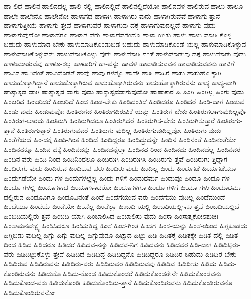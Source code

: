 {ಹಾ-ಲಿದೆ
ಹಾಲಿನ
ಹಾಲಿನದಲ್ಲ
ಹಾಲಿ-ನಲ್ಲಿ
ಹಾಲಿನಲ್ಲಿದೆ
ಹಾಲಿನಲ್ಲಿದೆಯೋ
ಹಾಲಿನವಳ
ಹಾಲಿರುವ
ಹಾಲು
ಹಾಲೂ
ಹಾಲೇ
ಹಾಲೇನೊ
ಹಾಲೇನೋ
ಹಾಳಾಗದ
ಹಾಳಾಗಿ
ಹಾಳಾಗಿರು-ವುದು
ಹಾಳಾಗಿರುವೆವೆ
ಹಾಳಾಗು-ತ್ತಾನೆ
ಹಾಳಾಗುತ್ತೀಯೆ
ಹಾಳಾಗು-ತ್ತೇವೆ
ಹಾಳಾಗುವರೆ
ಹಾಳಾಗುವು-ದಕ್ಕೆ
ಹಾಳಾಗುವುದಲ್ಲದೆ
ಹಾಳಾಗು-ವುದು
ಹಾಳಾಗುವುದೋ
ಹಾಳಾದರೂ
ಹಾಳಾದ-ವರು
ಹಾಳಾದವರೆಂದೂ
ಹಾಳಾ-ಯಿತು
ಹಾಳು
ಹಾಳು-ಮಾಡಿ-ಕೊಳ್ಳ-ಬಹುದು
ಹಾಳುಮಾಡ-ಬೇಕು
ಹಾಳುಮಾಡಿಕೊಂಡುಬಿಡ-ಬಹುದು
ಹಾಳುಮಾಡಿಕೊಂಡೆ-ಯಲ್ಲ
ಹಾಳುಮಾಡಿಕೊಳ್ಳುವ
ಹಾಳುಮಾಡಿಕೊಳ್ಳುವನು
ಹಾಳುಮಾಡಿಕೊಳ್ಳು-ವುದು
ಹಾಳುಮಾಡಿ-ದಂತೆ
ಹಾಳುಮಾಡುವು-ದಕ್ಕೆ
ಹಾಳುಮಾಡು-ವುದು
ಹಾಳುಮಾಡುವೆವು
ಹಾಳೂ-ರಲ್ಲ
ಹಾಳೂರಿಗೆ
ಹಾ-ವನ್ನು
ಹಾವಳಿ
ಹಾವಾಡಿಸುವವನ
ಹಾವಾಡಿಸುವವನು
ಹಾವಿಗೆ
ಹಾವಿನ
ಹಾವಿನಂತೆ
ಹಾವಿನೊಡನೆ
ಹಾವು
ಹಾವು-ಗಳನ್ನೂ
ಹಾವೇ
ಹಾಸಿ
ಹಾಸಿಗೆ
ಹಾಸು
ಹಾಸುಹೊ-ಕ್ಕಾಗಿ
ಹಾಸುಹೊಕ್ಕಾಗಿದ್ದಾನೆ
ಹಾಸುಹೊಕ್ಕಾಗಿರುವ
ಹಾಸುಹೊಕ್ಕಾಗಿರುವನು
ಹಾಸುಹೋಕ್ಕಾಗಿರುವನು
ಹಾಸ್ಯ
ಹಾಸ್ಯ-ವಾಗಿ
ಹಾಸ್ಯಾಸ್ಪದ-ವಾಗಿ
ಹಾಸ್ಯಾಸ್ಪದ-ವಾಗು-ವುದು
ಹಾಸ್ಯಾಸ್ಪದವಾಗುವುದೋ
ಹಾಹಾಕಾರ
ಹಿ
ಹಿಂಗಿ
ಹಿಂಗಿಲ್ಲ
ಹಿಂಗು-ವುದು
ಹಿಂಜರಿದ
ಹಿಂಜರಿದರೆ
ಹಿಂಜರಿದೆ
ಹಿಂಡ
ಹಿಂಡ-ಬೇಕು
ಹಿಂಡಿದಂತಿದೆ
ಹಿಂಡಿದರೂ
ಹಿಂಡಿದರೆ
ಹಿಂಡಿ-ದಾಗ
ಹಿಂಡುವ
ಹಿಂಡು-ವುದು
ಹಿಂಡುವುವೋ
ಹಿಂತಿರುಗದ
ಹಿಂತಿರುಗದಿರುವಿಕೆ-ಯನ್ನು
ಹಿಂತಿರುಗ-ಬೇಕು
ಹಿಂತಿರುಗಲಾಗುವುದಿಲ್ಲವೊ
ಹಿಂತಿರುಗ-ಲಾರದು
ಹಿಂತಿರುಗಿ
ಹಿಂತಿರುಗಿದರೂ
ಹಿಂತಿರುಗಿದರೆ
ಹಿಂತಿರುಗಿಸ-ಬೇಕು
ಹಿಂತಿರುಗಿಸುತ್ತಾರೆ
ಹಿಂತಿರುಗು-ತ್ತಾನೆ
ಹಿಂತಿರುಗುತ್ತಾರೆ
ಹಿಂತಿರುಗುವವರೆ
ಹಿಂತಿರುಗು-ವುದಿಲ್ಲ
ಹಿಂತಿರುಗುವುದಿಲ್ಲವೋ
ಹಿಂತಿರುಗು-ವುದು
ಹಿಂತೆಗೆಯದೆ
ಹಿಂ-ದಕ್ಕೆ
ಹಿಂದಿ-ಗಿಂತ
ಹಿಂದಿದೆ
ಹಿಂದಿದ್ದರೂ
ಹಿಂದಿದ್ದುದನ್ನೇ
ಹಿಂದಿನ
ಹಿಂದಿನಂತೆ
ಹಿಂದಿನಂತೆಯೇ
ಹಿಂದಿನದಕ್ಕೂ
ಹಿಂದಿನ-ದಕ್ಕೆ
ಹಿಂದಿನದನ್ನು
ಹಿಂದಿನದನ್ನೆಲ್ಲಾ
ಹಿಂದಿನದ-ರಿಂದ
ಹಿಂದಿನದು
ಹಿಂದಿನದೆಲ್ಲ
ಹಿಂದಿನವರ
ಹಿಂದಿನ-ವರು
ಹಿಂದಿ-ನಿಂದ
ಹಿಂದಿನಿಂದಲೂ
ಹಿಂದಿರುಗಿ
ಹಿಂದಿರುಗಿಸಿ
ಹಿಂದಿರುಗು-ತ್ತವೆ
ಹಿಂದಿರುಗು-ತ್ತಿದ್ದಾಗ
ಹಿಂದಿರುಗು-ವುದು
ಹಿಂದಿರುವ
ಹಿಂದಿರುವ-ವರು
ಹಿಂದಿರು-ವುದು
ಹಿಂದಿಲ್ಲ
ಹಿಂದು
ಹಿಂದುಗಡೆ
ಹಿಂದುಗಡೆಯೂ
ಹಿಂದುಗಡೆಯೇ
ಹಿಂದು-ಗಳ
ಹಿಂದುಗಳಲ್ಲೆಲ್ಲ
ಹಿಂದು-ಗಳಿಗೆ
ಹಿಂದುಧರ್ಮ
ಹಿಂದುವೂ
ಹಿಂದೂ
ಹಿಂದೂ-ಗಳ
ಹಿಂದೂ-ಗಳಲ್ಲಿ
ಹಿಂದೂಗಳಾದ
ಹಿಂದೂಗಳಾದರೋ
ಹಿಂದೂಗಳಿಗೂ
ಹಿಂದೂ-ಗಳಿಗೆ
ಹಿಂದೂ-ಗಳು
ಹಿಂದೂಧರ್ಮ-ದಲ್ಲಿರುವ
ಹಿಂದೂವಿಗೂ
ಹಿಂದೂವಿನಂತೆ
ಹಿಂದೆ
ಹಿಂದೆಗೆಯುವ-ವರು
ಹಿಂದೆಗೆಯು-ವುದಿಲ್ಲ
ಹಿಂದೆಮುಂದೆ
ಹಿಂದೆಯೂ
ಹಿಂದೆಯೆ
ಹಿಂದೆಯೇ
ಹಿಂದೆಲ್ಲ
ಹಿಂದೆಲ್ಲಾ
ಹಿಂಬದಿ-ಯಲ್ಲಿ
ಹಿಂಬದಿಯಲ್ಲಿಇರು-ತ್ತವೆ
ಹಿಂಬದಿಯಲ್ಲಿದೆ
ಹಿಂಬದಿಯಲ್ಲಿರು-ತ್ತವೆ
ಹಿಂಬದಿ-ಯಾಗಿ
ಹಿಂಬಾಲಿಸಿದ
ಹಿಂಬಾಲಿಸು-ವುದು
ಹಿಂಸಾ
ಹಿಂಸಾತ್ಮಕೋಽಶುಚಿಃ
ಹಿಂಸಾಮನವೇಕ್ಷ್ಯ
ಹಿಂಸಿಸಿದರೂ
ಹಿಂಸಿಸುತ್ತಿದ್ದ
ಹಿಂಸೆ
ಹಿಂಸೆ-ಗಿಂತ
ಹಿಂಸೆಗೆ
ಹಿಂಸೆ-ಯನ್ನು
ಹಿಂಸೆ-ಯಿಂದ
ಹಿಗ್ಗಕೂಡದು
ಹಿಗ್ಗಿಬಿಡು-ವುದಿಲ್ಲ
ಹಿಗ್ಗು
ಹಿಗ್ಗು-ವುದಿಲ್ಲ
ಹಿಗ್ಗುವುದೂ
ಹಿಟ್ಟಾದ
ಹಿಟ್ಟು
ಹಿಡಿ
ಹಿಡಿತಕ್ಕೆ
ಹಿಡಿತಕ್ಕೇ
ಹಿಡಿತ-ದಲ್ಲಿ
ಹಿಡಿತ-ದಿಂದ
ಹಿಡಿದ
ಹಿಡಿದರೂ
ಹಿಡಿದರೆ
ಹಿಡಿದವ-ನನ್ನು
ಹಿಡಿದವ-ನಿಗೆ
ಹಿಡಿದವನು
ಹಿಡಿದವರ
ಹಿಡಿ-ದಾಗ
ಹಿಡಿದಿಟ್ಟಿರು-ವರು
ಹಿಡಿದಿಟ್ಟುಕೊಳ್ಳು-ತ್ತೇವೆ
ಹಿಡಿದಿದೆ
ಹಿಡಿದಿದ್ದ
ಹಿಡಿದಿದ್ದನೊ
ಹಿಡಿದಿದ್ದರೂ
ಹಿಡಿದಿರ-ಬಹುದು
ಹಿಡಿದಿರ-ಬೇಕು
ಹಿಡಿದಿರುವ
ಹಿಡಿದಿರುವನು
ಹಿಡಿದಿರು-ವರು
ಹಿಡಿದಿರುವರೆ
ಹಿಡಿದಿರುವೆವು
ಹಿಡಿದಿವೆ
ಹಿಡಿದೀತು
ಹಿಡಿದು
ಹಿಡಿದು-ಕೊಂಡಿರುವನು
ಹಿಡಿದುಕೊ
ಹಿಡಿದು-ಕೊಂಡ
ಹಿಡಿದುಕೊಂಡರೆ
ಹಿಡಿದುಕೊಂಡರೇನೇ
ಹಿಡಿದುಕೊಂಡವನು
ಹಿಡಿದುಕೊಂಡ-ವರು
ಹಿಡಿದುಕೊಂಡಿ
ಹಿಡಿದುಕೊಂಡಿರು-ತ್ತಾನೆ
ಹಿಡಿದುಕೊಂಡಿರುವನು
ಹಿಡಿದುಕೊಂಡಿರುವನೊ
ಹಿಡಿದುಕೊಂಡಿರುವನೋ
}
